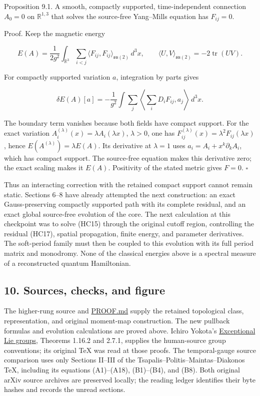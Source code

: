 \documentclass[11pt]{article}
\begin{document}
Proposition 9.1. A smooth, compactly supported, time-independent
connection \(A_0=0\) on \(\mathbb R^{1,3}\) that solves the source-free
Yang–Mills equation has \(F_{ij}=0\).

Proof. Keep the magnetic energy

\[
 E(A)=\frac1{2g^2}\int_{\mathbb R^3}
       \sum_{i<j}\langle F_{ij},F_{ij}\rangle_{\mathfrak{su}(2)}\,d^3x,
 \qquad\langle U,V\rangle_{\mathfrak{su}(2)}=-2\operatorname{tr}(UV).
\]

For compactly supported variation \(a\), integration by parts gives

\[
 \delta E(A)[a]=-\frac1{g^2}\int\sum_j
    \left\langle\sum_iD_iF_{ij},a_j\right\rangle\,d^3x.
\]

The boundary term vanishes because both fields have compact support.
For the exact variation \(A_i^{(\lambda)}(x)=\lambda A_i(\lambda x)\),
\(\lambda>0\), one has
\(F_{ij}^{(\lambda)}(x)=\lambda^2F_{ij}(\lambda x)\), hence
\(E(A^{(\lambda)})=\lambda E(A)\). Its derivative at \(\lambda=1\)
uses \(a_i=A_i+x^k\partial_kA_i\), which has compact support. The
source-free equation makes this derivative zero; the exact scaling
makes it \(E(A)\). Positivity of the stated metric gives \(F=0\).
\(\square\)

Thus an interacting correction with the retained compact support cannot
remain static. Sections 6–8 have already attempted the next construction:
an exact Gauss-preserving compactly supported path with its complete
residual, and an exact global source-free evolution of the core. The
next calculation at this checkpoint was to solve (HC15) through the original cutoff region,
controlling the residual (HC17), spatial propagation, finite energy, and
parameter derivatives. The soft-period family must then be coupled to
this evolution with its full period matrix and monodromy. None of the
classical energies above is a spectral measure of a reconstructed
quantum Hamiltonian.

\subsection*{10. Sources, checks, and figure}

The higher-rung source and \href{https://github.com/KokunoYumeto/yang-mills-interacting-workbench/blob/main/yang-mills/continuations/20260930-s6-ns-moment-map-bridge/PROOF.md}{PROOF.md} supply the retained
topological class, representation, and original moment-map construction.
The new pullback formulas and evolution calculations are proved above.
Ichiro Yokota's
\href{https://arxiv.org/abs/0902.0431}{Exceptional Lie groups}, Theorems
1.16.2 and 2.7.1, supplies the human-source group conventions; its original
TeX was read at those proofs. The temporal-gauge source comparison uses
only Sections II–III of the Tsapalis–Politis–Maintas–Diakonos TeX,
including its equations (A1)–(A18), (B1)–(B4), and (B8). Both original
arXiv source archives are preserved locally; the reading ledger identifies
their byte hashes and records the unread sections.
\end{document}

